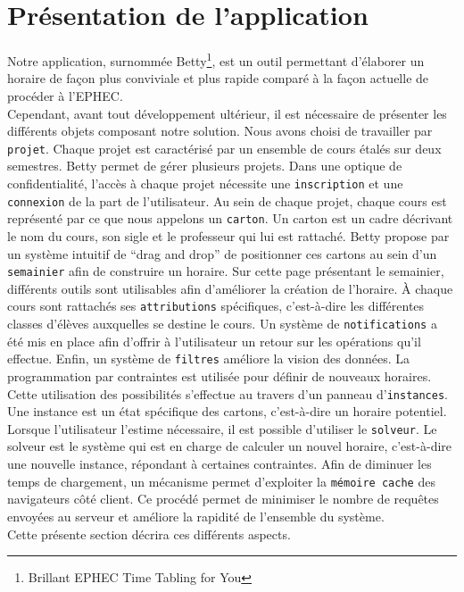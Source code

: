 

\chapter{Présentation de l'application}
Notre application, surnommée Betty\footnote{Brillant EPHEC Time Tabling for You}, est un outil permettant d'élaborer un horaire de façon plus conviviale et plus rapide comparé à la façon actuelle de procéder à l'EPHEC.\\
\newline
\indent
Cependant, avant tout développement ultérieur, il est nécessaire de présenter les différents objets composant notre solution. Nous avons choisi de travailler par \texttt{projet}. Chaque projet est caractérisé par un ensemble de cours étalés sur deux semestres. Betty permet de gérer plusieurs projets. Dans une optique de confidentialité, l'accès à chaque projet nécessite une \texttt{inscription} et une \texttt{connexion} de la part de l'utilisateur.
\newline
\indent
Au sein de chaque projet, chaque cours est représenté par ce que nous appelons un \texttt{carton}. Un carton est un cadre décrivant le nom du cours, son sigle et le professeur qui lui est rattaché. Betty propose par un système intuitif de \enquote{drag and drop} de positionner ces cartons au sein d'un \texttt{semainier} afin de construire un horaire.
\newline
\indent
Sur cette page présentant le semainier, différents outils sont utilisables afin d'améliorer la création de l'horaire. À chaque cours sont rattachés ses \texttt{attributions} spécifiques, c'est-à-dire les différentes classes d'élèves auxquelles se destine le cours. Un système de \texttt{notifications} a été mis en place afin d'offrir à l'utilisateur un retour sur les opérations qu'il effectue. Enfin, un système de \texttt{filtres} améliore la vision des données. 
\newline
\indent
La programmation par contraintes est utilisée pour définir de nouveaux horaires. Cette utilisation des possibilités s'effectue au travers d'un panneau d'\texttt{instances}. Une instance  est un état spécifique des cartons, c'est-à-dire un horaire potentiel. Lorsque l'utilisateur l'estime nécessaire, il est possible d'utiliser le  \texttt{solveur}. Le solveur est le système qui est en charge de calculer un nouvel horaire, c'est-à-dire une nouvelle instance, répondant à certaines contraintes.
\newline
\indent
Afin de diminuer les temps de chargement, un mécanisme permet d'exploiter la \texttt{mémoire cache} des navigateurs côté client. Ce procédé permet de minimiser le nombre de requêtes envoyées au serveur et améliore la rapidité de l'ensemble du système.\\
\newline
\indent
Cette présente section décrira ces différents aspects.


